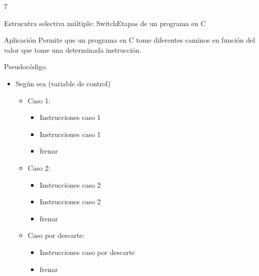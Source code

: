 7\documentclass[xcolor=pdftex,table,11pt]{beamer}
\begin{document}
\begin{frame}{Estrucutra selectiva múltiple: Switch}Etapas de un programa en C

 \begin{block}{Aplicación}
 Permite que un programa en C tome diferentes caminos en función del valor que tome una determinada instrucción.
 
 
 \end{block}

 \begin{block}{Pseudocódigo}

    \begin{itemize}
   \item[]Según sea (variable de control)
   \begin{itemize}

     	\item[] Caso 1:
     	    \begin{itemize}
     			\item[] Instrucciones caso 1
     			\item[] Instrucciones caso 1
     			\item[] frenar
     		   \end{itemize}

        \item[] Caso 2:
     	    \begin{itemize}
     			\item[] Instrucciones caso 2
     			\item[] Instrucciones caso 2

     			\item[] frenar
 		
   			\end{itemize}
    
    \item[] Caso por descarte:
     	    \begin{itemize}
     			\item[] Instrucciones caso por descarte
     			\item[] frenar
 		
   			\end{itemize}

   \end{itemize}

	\end{itemize}

 \end{block}





\end{frame}
\end{document}
